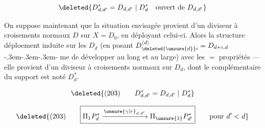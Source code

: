 \[
\deleted{D_{d,d'}^*=D_{d,d'}\mid D_d^*\quad\text{ouvert de }D_{d,d'}}
\]

On suppose maintenant que la situation envisagée provient d'un diviseur à croisements normaux $D$ sur $X=D_0$, en déployant celui-ci. Alors  la structure  déploement induite sur les $D_d$ (en posant $D_{\deleted{\unsure{d}}i}^{\langle d\rangle}=D_{d+i,d}$ \mbox{-\kern.3em-\kern.3em-\kern.3em-}  me  de développer au long et au large) avec les $=$ propriétés --- elle provient d'un diviseur à croisements normaux  sur $D_d$, dont le complémentaire du support est noté $D_d^*$.

\[
\deleted{(203)\qquad D_{d,d'}^*=D_{d,d'}\mid D_d^*}
\]

\[
\deleted{(203)\qquad\boxed{\Pi_1P_d^*\xrightarrow{\unsure{\gamma|r}_{d,d'}}\Pi_{\unsure{1}}P_{d'}^*}\qquad\text{pour }d'<d}
\]
